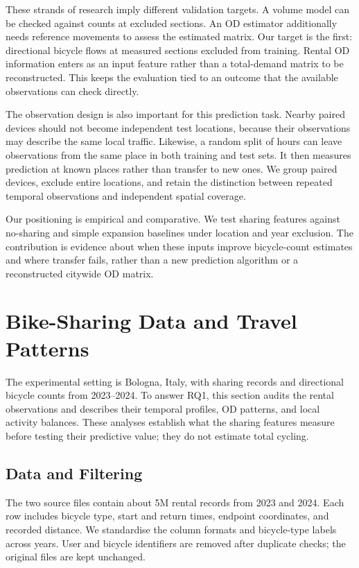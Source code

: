 \documentclass{interact}
\begin{document}
These strands of research imply different validation targets. A volume model can be checked against counts at excluded sections. An OD estimator additionally needs reference movements to assess the estimated matrix. Our target is the first: directional bicycle flows at measured sections excluded from training. Rental OD information enters as an input feature rather than a total-demand matrix to be reconstructed. This keeps the evaluation tied to an outcome that the available observations can check directly.

The observation design is also important for this prediction task. Nearby paired devices should not become independent test locations, because their observations may describe the same local traffic. Likewise, a random split of hours can leave observations from the same place in both training and test sets. It then measures prediction at known places rather than transfer to new ones. We group paired devices, exclude entire locations, and retain the distinction between repeated temporal observations and independent spatial coverage.

Our positioning is empirical and comparative. We test sharing features against no-sharing and simple expansion baselines under location and year exclusion. The contribution is evidence about when these inputs improve bicycle-count estimates and where transfer fails, rather than a new prediction algorithm or a reconstructed citywide OD matrix.

\section{Bike-Sharing Data and Travel Patterns}
\label{sec:sharing}
The experimental setting is Bologna, Italy, with sharing records and directional bicycle counts from 2023--2024. To answer RQ1, this section audits the rental observations and describes their temporal profiles, OD patterns, and local activity balances. These analyses establish what the sharing features measure before testing their predictive value; they do not estimate total cycling.

\subsection{Data and Filtering}
The two source files contain about 5M rental records from 2023 and 2024. Each row includes bicycle type, start and return times, endpoint coordinates, and recorded distance. We standardise the column formats and bicycle-type labels across years. User and bicycle identifiers are removed after duplicate checks; the original files are kept unchanged.
\end{document}
